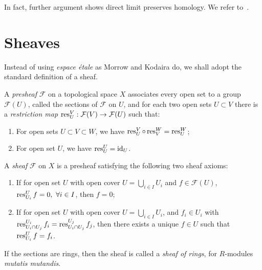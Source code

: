 \begin{rem}
    In fact, further argument shows direct limit preserves homology.
    We refer to~\cite[Lemma 10.8.8]{stacks-project}.
\end{rem}

\section{Sheaves}

Instead of using \emph{espace \'{e}tale} as Morrow and Kodaira do, we shall adopt the standard definition of a sheaf.

\begin{defn}
    A \emph{presheaf} $\mathcal{F}$ on a topological space $X$ associates every open set to a group $\mathcal{F}(U)$, called the sections of $\mathcal{F}$ on $U$, and for each two open sets $U\subset V$ there is a \emph{restriction map} $\operatorname{res}^V_U:\mathcal{F}(V)\to\mathcal{F}(U)$ such that:
    \begin{enumerate}[(1)]
        \item For open sets $U\subset V\subset W$, we have $\operatorname{res}^V_U\circ\operatorname{res}^W_V=\operatorname{res}^W_U$;
        \item For open set $U$, we have $\operatorname{res}^U_U=\mathrm{id}_U$.
    \end{enumerate}
    A \emph{sheaf} $\mathcal{F}$ on $X$ is a presheaf satisfying the following two sheaf axioms:
    \begin{enumerate}[(1)]
        \item If for open set $U$ with open cover $U=\bigcup_{i\in I}U_i$ and $f\in\mathcal{F}(U)$, $\operatorname{res}^U_{U_i}f=0,\ \forall i\in I$, then $f=0$;
        \item If for open set $U$ with open cover $U=\bigcup_{i\in I}U_i$, and $f_i\in U_i$ with $\operatorname{res}^{U_i}_{U_i\cap U_j}f_i=\operatorname{res}^{U_j}_{U_i\cap U_j}f_j$, then there exists a unique $f\in U$ such that $\operatorname{res}^U_{U_i}f=f_i$.
    \end{enumerate}
    If the sections are rings, then the sheaf is called a \emph{sheaf of rings}, for $R$-modules \emph{mutatis mutandis}.
\end{defn}

